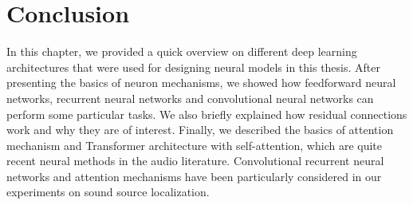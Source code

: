 \section{Conclusion}
In this chapter, we provided a quick overview on different deep learning architectures that were used for designing neural models in this thesis. After presenting the basics of neuron mechanisms, we showed how feedforward neural networks, recurrent neural networks and convolutional neural networks can perform some particular tasks. We also briefly explained how residual connections work and why they are of interest. Finally, we described the basics of attention mechanism and Transformer architecture with self-attention, which are quite recent neural methods in the audio literature. Convolutional recurrent neural networks and attention mechanisms have been particularly considered in our experiments on sound source localization.
